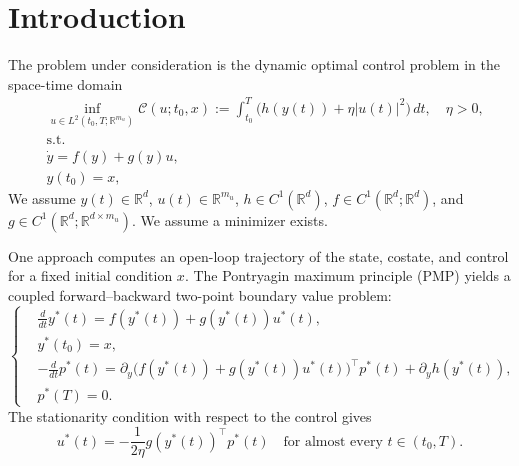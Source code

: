 \documentclass[11pt]{amsart}
\theoremstyle{definition}
\theoremstyle{remark}
\begin{document}
\section{Introduction}
The problem under consideration is the dynamic optimal control problem in the space-time domain
\begin{equation*}
\tag{$P$}\label{opt}
\begin{aligned}
	&\inf_{u \in L^2(t_0,T;\mathbb R^{m_u})}
	\mathcal C(u;t_0,x)
	:=\int_{t_0}^T\bigl(h(y(t))+\eta|u(t)|^2\bigr)\,dt,
	\quad\eta>0,\\
	&\text{s.t.}\\
	& \dot{y} = f(y) + g(y) u,\\
	& y(t_0) = x,
\end{aligned}
\end{equation*}
We assume $y(t)\in\mathbb R^d$, $u(t)\in\mathbb R^{m_u}$,
$h\in C^1(\mathbb R^d)$,
$f\in C^1(\mathbb R^d;\mathbb R^d)$, and
$g\in C^1(\mathbb R^d;\mathbb R^{d\times m_u})$. We assume a minimizer exists.

One approach computes an open-loop trajectory of the state, costate, and control
for a fixed initial condition $x$. The Pontryagin maximum principle (PMP) yields a coupled
forward--backward two-point boundary value problem:
\begin{equation*}
\tag{TPBVP}\label{TPBVP}
\left\{
\begin{aligned}
	&\frac{d}{dt}y^*(t) = f(y^*(t)) + g(y^*(t))u^*(t),\\
	& y^*(t_0) = x, \\
	& -\frac{d}{dt} p^*(t) = \partial_y \bigg( f(y^*(t)) +  g(y^*(t)) u^*(t) \bigg)^\top p^*(t) + \partial_y h(y^*(t)),\\
	& p^*(T) = 0.
\end{aligned}
\right.
\end{equation*}
The stationarity condition with respect to the control gives
\begin{equation*}
	u^*(t) = - \frac{1}{2\eta} g(y^*(t))^\top p^*(t)
	\quad\text{for almost every }t\in(t_0,T).
\end{equation*}
\end{document}
